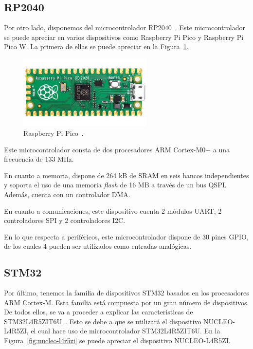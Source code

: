 \subsection{RP2040}\label{subsec:RP2040}

Por otro lado, disponemos del microcontrolador RP2040~\cite{rp2040-spec}.
Este microcontrolador se puede apreciar en varios dispositivos como Raspberry Pi Pico y Raspberry Pi Pico W.
La primera de ellas se puede apreciar en la Figura~\ref{fig:raspberry-pico}.

\begin{figure}[h]
    \centering
    \includegraphics[width=0.6\textwidth]{figures/raspberry-pico.jpeg}
    \caption{Raspberry Pi Pico~\cite{rp2040-img}.}
    \label{fig:raspberry-pico}
\end{figure}

Este microcontrolador consta de dos procesadores ARM Cortex-M0+ a una frecuencia de 133 MHz.

En cuanto a memoria, dispone de 264 kB de SRAM en seis bancos independientes y soporta el uso de una memoria \textit{flash} de 16 MB a través de un bus QSPI.
Además, cuenta con un controlador \ac{DMA}.

En cuanto a comunicaciones, este dispositivo cuenta 2 módulos \ac{UART}, 2 controladores \ac{SPI} y 2 controladores \ac{I2C}.

En lo que respecta a periféricos, este microcontrolador dispone de 30 pines \ac{GPIO}, de los cuales 4 pueden ser utilizados como entradas analógicas.


\subsection{STM32}\label{subsec:stm32}

Por último, tenemos la familia de dispositivos STM32 basados en los procesadores ARM Cortex-M.
Esta familia está compuesta por un gran número de dispositivos.
De todos ellos, se va a proceder a explicar las características de STM32L4R5ZIT6U~\cite{nucleo-spec}.
Esto se debe a que se utilizará el dispositivo NUCLEO-L4R5ZI, el cual hace uso de microcontrolador STM32L4R5ZIT6U.
En la Figura~\ref{fig:nucleo-l4r5zi} se puede apreciar el dispositivo NUCLEO-L4R5ZI.

